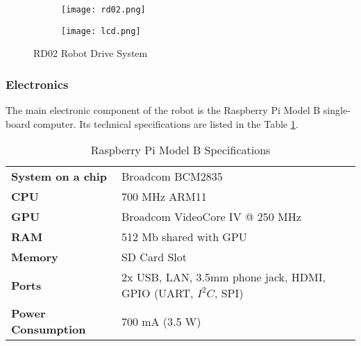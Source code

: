 \begin{figure}[h!]
\centering 

	\begin{subfigure}[h]{0.35\textwidth}
		\centering
			\texttt{[image: rd02.png]}
			\label{fig:rd02}
	\end{subfigure}
	\begin{subfigure}[h]{0.35\textwidth}
		\centering 
			\texttt{[image: lcd.png]}
			\label{fig:lcd_us}
	\end{subfigure}

\caption{RD02 Robot Drive System}
\label{fig:modules}
\end{figure}

\subsubsection{Electronics}
 
The main electronic component of the robot is the Raspberry Pi Model
B single-board computer. Its technical specifications are listed in the Table
\ref{tab:rpi_specs}.

\begin{table}[h!]
	\setlength\extrarowheight{2pt}
    \begin{tabularx}{\textwidth}{XX}
   	\toprule
	    \textbf{System on a chip}  & Broadcom BCM2835                                            \\
	    \textbf{CPU  }             & 700 MHz ARM11                                               \\
	    \textbf{GPU}               & Broadcom VideoCore IV @ 250 MHz                             \\
	    \textbf{RAM}               & 512 Mb shared with GPU                                      \\
	    \textbf{Memory}            & SD Card Slot                                                \\
	    \textbf{Ports}             & 2x USB, LAN, 3.5mm phone jack, HDMI,  GPIO (UART, $I^2C$, SPI) \\
	    \textbf{Power Consumption} & 700 mA (3.5 W)                                              \\
    \bottomrule
    \end{tabularx}
    \caption{Raspberry Pi Model B Specifications}
    \label{tab:rpi_specs}
\end{table}

